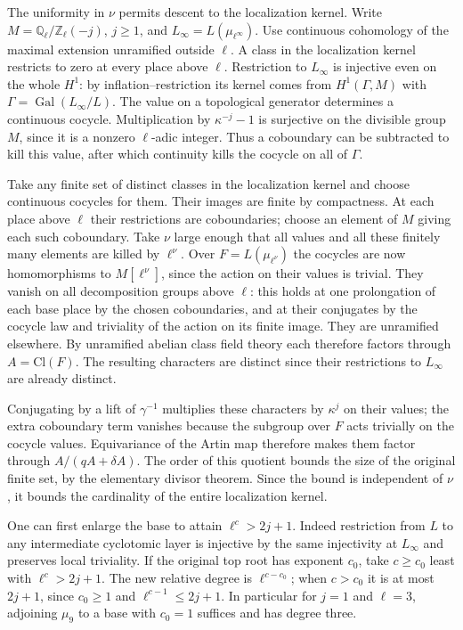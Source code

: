 \documentclass[11pt]{amsart}
\theoremstyle{definition}
\theoremstyle{remark}
\begin{document}
The uniformity in $\nu$ permits descent to the localization kernel.
Write $M=\mathbb Q_\ell/\mathbb Z_\ell(-j)$, $j\ge1$, and
$L_\infty=L(\mu_{\ell^\infty})$. Use continuous cohomology of the
maximal extension unramified outside $\ell$. A class in the
localization kernel restricts to zero at every place above $\ell$.
Restriction to $L_\infty$ is injective even on the whole $H^1$:
by inflation--restriction its kernel comes from
$H^1(\Gamma,M)$ with $\Gamma=\operatorname{Gal}(L_\infty/L)$.
The value on a topological generator determines a continuous
cocycle. Multiplication by $\kappa^{-j}-1$ is surjective on the
divisible group $M$, since it is a nonzero $\ell$-adic integer.
Thus a coboundary can be subtracted to kill this value, after which
continuity kills the cocycle on all of $\Gamma$.

Take any finite set of distinct classes in the localization kernel
and choose continuous cocycles for them. Their images are finite by
compactness. At each place above $\ell$ their restrictions are
coboundaries; choose an element of $M$ giving each such coboundary.
Take $\nu$ large enough that all values and all these finitely many
elements are killed by $\ell^\nu$. Over $F=L(\mu_{\ell^\nu})$ the
cocycles are now homomorphisms to $M[\ell^\nu]$, since the action
on their values is trivial. They vanish on all decomposition groups
above $\ell$: this holds at one prolongation of each base place by
the chosen coboundaries, and at their conjugates by the cocycle law
and triviality of the action on its finite image. They are unramified
elsewhere. By unramified abelian class field theory each therefore
factors through $A=\mathrm{Cl}(F)$. The resulting characters are
distinct since their restrictions to $L_\infty$ are already distinct.

Conjugating by a lift of $\gamma^{-1}$ multiplies these characters
by $\kappa^j$ on their values; the extra coboundary term vanishes
because the subgroup over $F$ acts trivially on the cocycle values.
Equivariance of the Artin map therefore makes them factor through
$A/(qA+\delta A)$. The order of this quotient bounds the size of
the original finite set, by the elementary divisor theorem. Since
the bound is independent of $\nu$, it bounds the cardinality of
the entire localization kernel.

One can first enlarge the base to attain $\ell^c>2j+1$. Indeed
restriction from $L$ to any intermediate cyclotomic layer is
injective by the same injectivity at $L_\infty$ and preserves
local triviality. If the original top root has exponent $c_0$,
take $c\ge c_0$ least with $\ell^c>2j+1$. The new relative
degree is $\ell^{c-c_0}$; when $c>c_0$ it is at most $2j+1$,
since $c_0\ge1$ and $\ell^{c-1}\le2j+1$.
In particular for $j=1$ and $\ell=3$, adjoining $\mu_9$ to a base
with $c_0=1$ suffices and has degree three.
\end{document}
